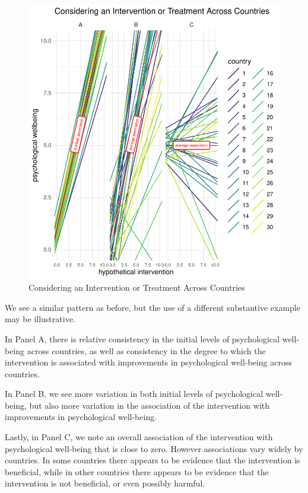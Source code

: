 \documentclass[
  letterpaper,
  DIV=11,
  numbers=noendperiod]{scrreprt}
\begin{document}
\begin{figure}

{\centering \includegraphics{./intro_files/figure-pdf/fig-variation2-1.pdf}

}

\caption{\label{fig-variation2}Considering an Intervention or Treatment
Across Countries}

\end{figure}

We see a similar pattern as before, but the use of a different
substantive example may be illustrative.

In Panel A, there is relative consistency in the initial levels of
psychological well-being across countries, as well as consistency in the
degree to which the intervention is associated with improvements in
psychological well-being across countries.

In Panel B, we see more variation in both initial levels of
psychological well-being, but also more variation in the association of
the intervention with improvements in psychological well-being.

Lastly, in Panel C, we note an overall association of the intervention
with psychological well-being that is close to zero. However
associations vary widely by countries. In some countries there appears
to be evidence that the intervention is beneficial, while in other
countries there appears to be evidence that the intervention is not
beneficial, or even possibly harmful.
\end{document}
